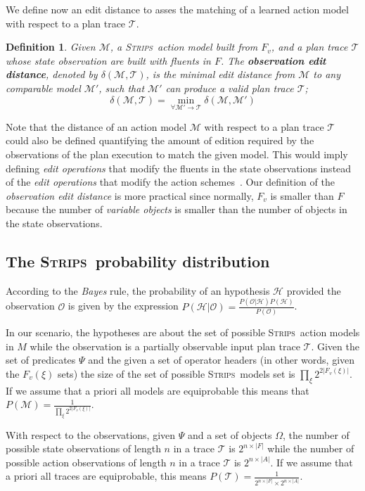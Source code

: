 \documentclass[letterpaper]{article} %
\newcommand{\strips}{\textsc{Strips}}     %
\newtheorem{definition}[theorem]{Definition}
\begin{document}
We define now an edit distance to asses the matching of a learned action model with respect to a plan trace $\mathcal{T}$. 

\begin{definition}
  Given $\mathcal{M}$, a \strips\ action model built from $F_v$, and a plan trace $\mathcal{T}$ whose state observation are built with fluents in $F$. The {\bf observation edit distance}, denoted by  $\delta(\mathcal{M},\mathcal{T})$, is the minimal edit distance from $\mathcal{M}$ to any {\em comparable} model $\mathcal{M}'$, such that $\mathcal{M}'$ can produce a valid plan trace $\mathcal{T}$; \[\delta(\mathcal{M},\mathcal{T})=\min_{\forall \mathcal{M}' \rightarrow \mathcal{T}} \delta(\mathcal{M},\mathcal{M}')\]
\end{definition}

Note that the distance of an action model $\mathcal{M}$ with respect to a plan trace $\mathcal{T}$ could also be defined quantifying the amount of edition required by the observations of the plan execution to match the given model. This would imply defining {\em edit operations} that modify the fluents in the state observations instead of the {\em edit operations} that modify the action schemes~\cite{sohrabi:precognition:IJCAI2016}. Our definition of the {\em observation edit distance} is more practical since normally, $F_v$ is smaller than $F$ because the number of {\em variable objects} is smaller than the number of objects in the state observations.


\subsection{The \strips\ probability distribution}
According to the {\em Bayes} rule, the probability of an hypothesis $\mathcal{H}$ provided the observation $\mathcal{O}$ is given by the expression $P(\mathcal{H}|\mathcal{O})=\frac{P(\mathcal{O}|\mathcal{H})P(\mathcal{H})}{P(\mathcal{O})}$.

In our scenario, the hypotheses are about the set of possible \strips\ action models in $M$ while the observation is a partially observable input plan trace $\mathcal{T}$. Given the set of predicates $\Psi$ and the given a set of operator headers (in other words, given the $F_v(\xi)$ sets) the size of the set of possible \strips\ models set is $\prod_\xi 2^{2|F_v(\xi)|}$. If we assume that a priori all models are equiprobable this means that $P(\mathcal{M})=\frac{1}{\prod_\xi 2^{2|F_v(\xi)|}}$.

With respect to the observations, given $\Psi$ and a set of objects $\Omega$, the number of possible state observations of length $n$ in a trace $\mathcal{T}$ is $2^{n\times|F|}$ while the number of possible action observations of length $n$ in a trace $\mathcal{T}$ is $2^{n\times|A|}$. If we assume that a priori all traces are equiprobable, this means $P(\mathcal{T})=\frac{1}{2^{n\times|F|}\times 2^{n\times|A|}}$.
\end{document}
